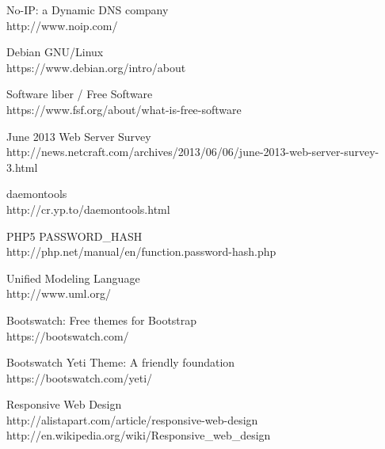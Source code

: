 \documentclass[12pt,a4paper]{article}
\begin{document}
\begin{thebibliography}{99}
	No-IP: a Dynamic DNS company \\
	http://www.noip.com/
	
	Debian GNU/Linux \\
	https://www.debian.org/intro/about

	Software liber / Free Software \\
	https://www.fsf.org/about/what-is-free-software
	
	June 2013 Web Server Survey\\
	\small{http://news.netcraft.com/archives/2013/06/06/june-2013-web-server-survey-3.html}
	
	daemontools\\
	http://cr.yp.to/daemontools.html

	PHP5 PASSWORD\_HASH\\
	http://php.net/manual/en/function.password-hash.php
	
	Unified Modeling Language\\
	http://www.uml.org/
	
	Bootswatch: Free themes for Bootstrap\\
	https://bootswatch.com/
	
	Bootswatch Yeti Theme: A friendly foundation\\
	https://bootswatch.com/yeti/
	
	Responsive Web Design\\
	http://alistapart.com/article/responsive-web-design\\
	http://en.wikipedia.org/wiki/Responsive\_web\_design	
	

\end{thebibliography}
\endgroup
\newpage
\tableofcontents
\end{document}
